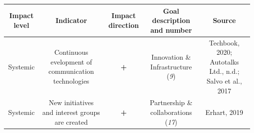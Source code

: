 \documentclass[
]{book}
\begin{document}
\begin{longtable}[]{@{}ccccc@{}}
\toprule
\begin{minipage}[b]{0.17\columnwidth}\centering
Impact level\strut
\end{minipage} & \begin{minipage}[b]{0.16\columnwidth}\centering
Indicator\strut
\end{minipage} & \begin{minipage}[b]{0.17\columnwidth}\centering
Impact direction\strut
\end{minipage} & \begin{minipage}[b]{0.17\columnwidth}\centering
Goal description and number\strut
\end{minipage} & \begin{minipage}[b]{0.17\columnwidth}\centering
Source\strut
\end{minipage}\tabularnewline
\midrule
\endhead
\begin{minipage}[t]{0.17\columnwidth}\centering
Systemic\strut
\end{minipage} & \begin{minipage}[t]{0.16\columnwidth}\centering
Continuous evelopment of communication technologies\strut
\end{minipage} & \begin{minipage}[t]{0.17\columnwidth}\centering
\textbf{+}\strut
\end{minipage} & \begin{minipage}[t]{0.17\columnwidth}\centering
Innovation \& Infrastructure (\emph{9})\strut
\end{minipage} & \begin{minipage}[t]{0.17\columnwidth}\centering
Techbook, 2020; Autotalks Ltd., n.d.; Salvo et al., 2017\strut
\end{minipage}\tabularnewline
\begin{minipage}[t]{0.17\columnwidth}\centering
Systemic\strut
\end{minipage} & \begin{minipage}[t]{0.16\columnwidth}\centering
New initiatives and interest groups are created\strut
\end{minipage} & \begin{minipage}[t]{0.17\columnwidth}\centering
\textbf{+}\strut
\end{minipage} & \begin{minipage}[t]{0.17\columnwidth}\centering
Partnership \& collaborations (\emph{17})\strut
\end{minipage} & \begin{minipage}[t]{0.17\columnwidth}\centering
Erhart, 2019\strut
\end{minipage}\tabularnewline
\bottomrule
\end{longtable}
\end{document}
